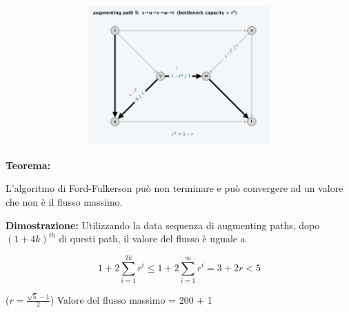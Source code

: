 \begin{figure}[H]
\begin{subfigure}{\textwidth}
\begin{subfigure}{.33\textwidth}
			\includegraphics[width=\linewidth]{capitoli/network_flow/imgs/ex9.png}
		\end{subfigure}
	\end{subfigure}
\end{figure}

\textbf{Teorema:}
\begin{myblockquote}
	L'algoritmo di Ford-Fulkerson
	può non terminare e può convergere ad un valore che non è il flusso
	massimo.
\end{myblockquote}

\textbf{Dimostrazione:} Utilizzando la data sequenza di augmenting
paths, dopo $(1+4k)^{th}$ di questi path, il valore del flusso è
uguale a

$$
	1 + 2 \sum^{2k}_{i=1}r^i \le 1 + 2 \sum^{\infty}_{i=1}r^i = 3 + 2r < 5
$$

($r = \frac{\sqrt{5}-1}{2}$) Valore del flusso massimo = 200 + 1
